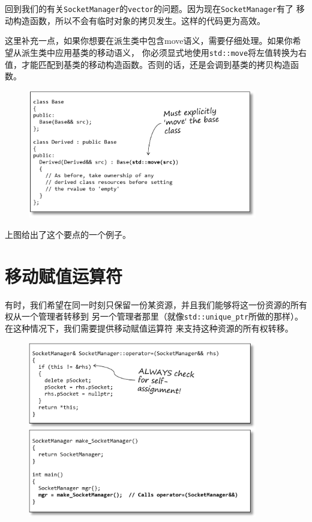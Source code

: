 \documentclass[12pt]{article}
\begin{document}
\indent{}回到我们的有关\texttt{SocketManager}的\texttt{vector}的问题。因为现在\texttt{SocketManager}有了
移动构造函数，所以不会有临时对象的拷贝发生。这样的代码更为高效。

\indent{}这里补充一点，如果你想要在派生类中包含move语义，需要仔细处理。如果你希望从派生类中应用基类的移动语义，
你必须显式地使用\texttt{std::move}将左值转换为右值，才能匹配到基类的移动构造函数。否则的话，还是会调到基类的拷贝构造函数。

\begin{figure}[h]
\centering
\includegraphics[width=10cm]{./imgs/image.QXK6S0.png}
\end{figure}
\noindent{}上图给出了这个要点的一个例子。

\section{移动赋值运算符}
\indent{}有时，我们希望在同一时刻只保留一份某资源，并且我们能够将这一份资源的所有权从一个管理者转移到
另一个管理者那里（就像\texttt{std::unique\_ptr}所做的那样）。在这种情况下，我们需要提供移动赋值运算符
来支持这种资源的所有权转移。

\begin{figure}[h]
\centering
\includegraphics[width=10cm]{./imgs/image.F07TS0.png}
\end{figure}
\end{document}
